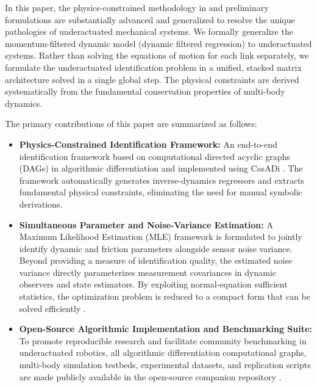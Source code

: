 \documentclass[lettersize,journal]{IEEEtran}
\begin{document}
In this paper, the physics-constrained methodology in \cite{omar2024robust} and preliminary formulations \cite{Asker2024} are substantially advanced and generalized to resolve the unique pathologies of underactuated mechanical systems. We formally generalize the momentum-filtered dynamic model (dynamic filtered regression) to underactuated systems. Rather than solving the equations of motion for each link separately, we formulate the underactuated identification problem in a unified, stacked matrix architecture solved in a single global step. The physical constraints are derived systematically from the fundamental conservation properties of multi-body dynamics.

The primary contributions of this paper are summarized as follows: 
\begin{itemize} 
	\item \textbf{Physics-Constrained Identification Framework:} An end-to-end identification framework based on computational directed acyclic graphs (DAGs) in algorithmic differentiation and implemented using CasADi \cite{Andersson2019}. The framework automatically generates inverse-dynamics regressors and extracts fundamental physical constraints, eliminating the need for manual symbolic derivations.
	 
	\item \textbf{Simultaneous Parameter and Noise-Variance Estimation:} A Maximum Likelihood Estimation (MLE) framework is formulated to jointly identify dynamic and friction parameters alongside sensor noise variance. Beyond providing a measure of identification quality, the estimated noise variance directly parameterizes measurement covariances in dynamic observers and state estimators. By exploiting normal-equation sufficient statistics, the optimization problem is reduced to a compact form that can be solved efficiently \cite{Wachter2006}.

	\item \textbf{Open-Source Algorithmic Implementation and Benchmarking Suite:} To promote reproducible research and facilitate community benchmarking in underactuated robotics, all algorithmic differentiation computational graphs, multi-body simulation testbeds, experimental datasets, and replication scripts are made publicly available in the open-source companion repository \cite{AskerRepo2026}.
\end{itemize}
\end{document}
